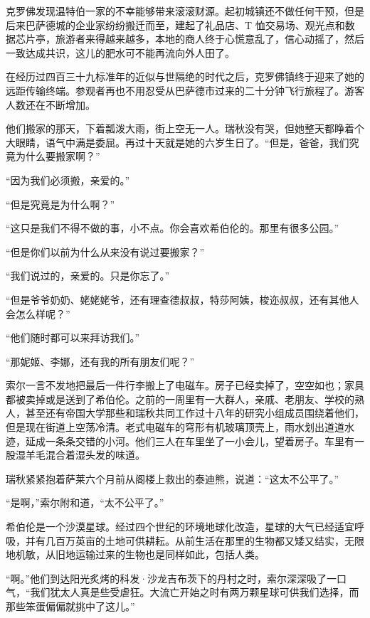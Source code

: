 \documentclass[AutoFakeBold=true]{book}
\begin{document}
克罗佛发现温特伯一家的不幸能够带来滚滚财源。起初城镇还不做任何干预，但是后来巴萨德城的企业家纷纷搬迁而至，建起了礼品店、T 恤交易场、观光点和数据芯片亭，旅游者来得越来越多，本地的商人终于心慌意乱了，信心动摇了，然后一致达成共识，这儿的肥水可不能再流向外人田了。

在经历过四百三十九标准年的近似与世隔绝的时代之后，克罗佛镇终于迎来了她的远距传输终端。参观者再也不用忍受从巴萨德市过来的二十分钟飞行旅程了。游客人数还在不断增加。

\vspace*{1em}

他们搬家的那天，下着瓢泼大雨，街上空无一人。瑞秋没有哭，但她整天都睁着个大眼睛，语气中满是委屈。再过十天就是她的六岁生日了。``但是，爸爸，我们究竟为什么要搬家啊？''

``因为我们必须搬，亲爱的。''

``但是究竟是为什么啊？''

``这只是我们不得不做的事，小不点。你会喜欢希伯伦的。那里有很多公园。''

``但是你们以前为什么从来没有说过要搬家？''

``我们说过的，亲爱的。只是你忘了。''

``但是爷爷奶奶、姥姥姥爷，还有理查德叔叔，特莎阿姨，梭迩叔叔，还有其他人会怎么样呢？''

``他们随时都可以来拜访我们。''

``那妮姬、李娜，还有我的所有朋友们呢？''

索尔一言不发地把最后一件行李搬上了电磁车。房子已经卖掉了，空空如也；家具都被卖掉或是送到了希伯伦。之前的一周里有一大群人，亲戚、老朋友、学校的熟人，甚至还有帝国大学那些和瑞秋共同工作过十八年的研究小组成员围绕着他们，但是现在街道上空荡冷清。老式电磁车的穹形有机玻璃顶壳上，雨水划出道道水迹，延成一条条交错的小河。他们三人在车里坐了一小会儿，望着房子。车里有一股湿羊毛混合着湿头发的味道。

瑞秋紧紧抱着萨莱六个月前从阁楼上救出的泰迪熊，说道：``这太不公平了。''

``是啊，''索尔附和道，``太不公平了。''

\vspace*{1em}

希伯伦是一个沙漠星球。经过四个世纪的环境地球化改造，星球的大气已经适宜呼吸，并有几百万英亩的土地可供耕耘。从前生活在那里的生物都又矮又结实，无限地机敏，从旧地运输过来的生物也是同样如此，包括人类。

``啊。''他们到达阳光炙烤的科发·沙龙吉布茨下的丹村之时，索尔深深吸了一口气，``我们犹太人真是些受虐狂。大流亡开始之时有两万颗星球可供我们选择，而那些笨蛋偏偏就挑中了这儿。''
\end{document}
